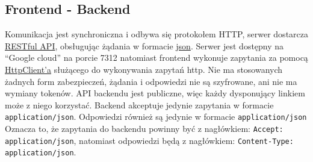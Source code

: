 \documentclass{article}
\begin{document}
    \subsection{Frontend - Backend}
    Komunikacja jest synchroniczna i odbywa się protokołem HTTP, serwer dostarcza
    \href{https://en.wikipedia.org/wiki/Representational_state_transfer}{RESTful API},
    obsługując żądania w formacie
    \href{https://en.wikipedia.org/wiki/JSON}{json}.
    Serwer jest dostępny na ``Google cloud'' na porcie 7312
    natomiast frontend wykonuje zapytania za pomocą
    \href{https://angular.io/guide/http}{HttpClient'a} służącego do wykonywania zapytań http.
    Nie ma stosowanych żadnych form zabezpieczeń, żądania i odpowiedzi nie są szyfrowane, ani nie ma wymiany tokenów.
    API backendu jest publiczne, więc każdy dysponujący linkiem może z niego korzystać.
    Backend akceptuje jedynie zapytania w formacie \texttt{application/json}.
    Odpowiedzi również są jedynie w formacie \texttt{application/json}
    Oznacza to, że zapytania do backendu powinny być z nagłówkiem: \texttt{Accept: application/json},
    natomiast odpowiedzi będą z nagłówkiem: \texttt{Content-Type: application/json}.
\end{document}
